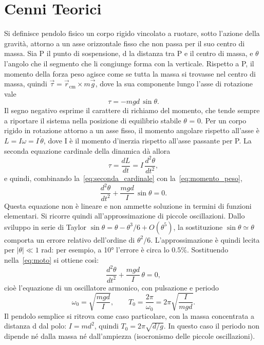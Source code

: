 \documentclass[a4paper]{article}
\begin{document}
\section{Cenni Teorici}\label{sec:cenni_teorici}
Si definisce pendolo fisico un corpo rigido vincolato a ruotare, sotto l’azione della gravità, attorno a un asse orizzontale fisso che non passa per il suo centro di massa. Sia P il punto di sospensione, d la distanza tra P e il centro di massa, e $\theta$ l’angolo che il segmento che li congiunge forma con la verticale. Rispetto a P, il momento della forza peso agisce come se tutta la massa si trovasse nel centro di massa, quindi $\vec\tau = \vec r_{\mathrm{cm}} \times m\vec g$, dove la sua componente lungo l’asse di rotazione vale
\begin{equation}
    \tau = -mgd\,\sin\theta .
    \label{eq:momento_peso}
\end{equation}
Il segno negativo esprime il carattere di richiamo del momento, che tende sempre a riportare il sistema nella posizione di equilibrio stabile $\theta$ = 0.
Per un corpo rigido in rotazione attorno a un asse fisso, il momento angolare rispetto all’asse è $L = I\omega = I\,\dot\theta$, dove I è il momento d’inerzia rispetto all’asse passante per P. La seconda equazione cardinale della dinamica dà allora
\begin{equation}
    \tau = \frac{dL}{dt} = I\,\frac{d^2\theta}{dt^2},
    \label{eq:seconda_cardinale}
\end{equation}
e quindi, combinando la~\eqref{eq:seconda_cardinale} con la~\eqref{eq:momento_peso},
\begin{equation}
    \frac{d^2\theta}{dt^2} + \frac{mgd}{I}\,\sin\theta = 0.
    \label{eq:moto}
\end{equation}
Questa equazione non è lineare e non ammette soluzione in termini di funzioni elementari. Si ricorre quindi all’approssimazione di piccole oscillazioni. Dallo sviluppo in serie di Taylor $\sin\theta = \theta - \theta^3/6 + O(\theta^5)$, la sostituzione $\sin\theta \simeq \theta$ comporta un errore relativo dell’ordine di $\theta^2/6$. L’approssimazione è quindi lecita per $|\theta| \ll 1$ rad: per esempio, a 10° l’errore è circa lo $0.5\%$. Sostituendo nella~\eqref{eq:moto} si ottiene così:
\begin{equation}
    \frac{d^2\theta}{dt^2} + \frac{mgd}{I}\,\theta = 0,
    \label{eq:moto_lineare}
\end{equation}
cioè l’equazione di un oscillatore armonico, con pulsazione e periodo
\begin{equation}
    \omega_0 = \sqrt{\frac{mgd}{I}}, \qquad T_0 = \frac{2\pi}{\omega_0} = 2\pi\sqrt{\frac{I}{mgd}}.
    \label{eq:omega_T0}
\end{equation}
Il pendolo semplice si ritrova come caso particolare, con la massa concentrata a distanza d dal polo: $I = md^2$, quindi $T_0 = 2\pi\sqrt{d/g}$. In questo caso il periodo non dipende né dalla massa né dall’ampiezza (isocronismo delle piccole oscillazioni).
\end{document}
